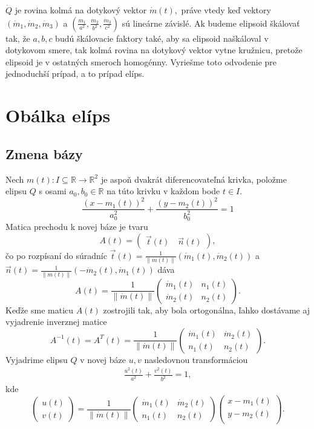 $ \dot{Q}$ je rovina kolmá na dotykový vektor $\dot{m}(t), $ práve vtedy keď vektory $(\dot{m}_1, \dot{m}_2, \dot{m}_3) $ a $(\frac{\dot{m}_1}{a^2}, \frac{\dot{m}_2}{b^2}, \frac{\dot{m}_3}{c^2}) $ sú lineárne závislé. Ak budeme elipsoid škálovať tak, že $a, b, c$ budú škálovacie faktory také, aby sa elipsoid naškáloval v dotykovom smere, tak kolmá rovina na dotykový vektor vytne kružnicu, pretože elipsoid je v ostatných smeroch homogénny. Vyriešme toto odvodenie pre jednoduchší prípad, a to prípad elíps.

\section{Obálka elíps}
\subsection{Zmena bázy}
Nech $m(t) \colon  I \subseteq \mathbb{R} \rightarrow \mathbb{R}^2$ je aspoň dvakrát diferencovateľná krivka, položme elipsu $Q$ s osami $a_0, b_0 \in \mathbb{R}$ na túto krivku v každom bode $t \in I.$
\begin{equation*}
\frac{{(x - m_1(t))^2}}{a_0^2} + \frac{{(y - m_2(t))^2}}{b_0^2} = 1
\end{equation*}
Matica prechodu k novej báze je tvaru
$$
A(t) = \left(\begin{matrix} \vec{t}(t) \quad \vec{n}(t)
\end{matrix} \right),
$$
čo po rozpísaní do súradníc $\vec{t}(t) = \frac{1}{ \| \dot{m}(t) \|}( \dot{m}_1(t),  \dot{m}_2(t))$ a $\vec{n}(t) = \frac{1}{ \| \dot{m}(t) \|}( -\dot{m}_2(t),  \dot{m}_1(t))$ dáva 
$$
A(t) = \frac{1}{ \| \dot{m}(t) \|} \left(\begin{matrix}
   \dot{m}_1(t) & n_1(t) \\
   \dot{m}_2(t) & n_2(t)
\end{matrix} \right).
$$
Keďže sme maticu $A(t)$ zostrojili tak, aby bola ortogonálna, ľahko dostávame aj vyjadrenie inverznej matice
$$
A^{-1}(t) = A^{T}(t) = \frac{1}{ \| \dot{m}(t) \|} \left(\begin{matrix}
  \dot{m}_1(t) & \dot{m}_2(t) \\
    n_1(t) & n_2(t)
\end{matrix}\right).
$$
Vyjadrime elipsu $Q$ v novej báze $ u, v$ nasledovnou transformáciou
\begin{align*}
\frac{u^2(t)}{a^2} + \frac{v^2(t)}{b^2} = 1,
\end{align*}
kde 
$$
\left(\begin{matrix}
u(t) \\
v(t)
\end{matrix}\right) = \frac{1}{ \| \dot{m}(t) \|}
\left(\begin{matrix}
  \dot{m}_1(t) & \dot{m}_2(t) \\
    n_1(t) & n_2(t)
\end{matrix}\right)
\left(\begin{matrix}
x-m_1(t) \\
y-m_2(t) \\
\end{matrix}\right).
$$
